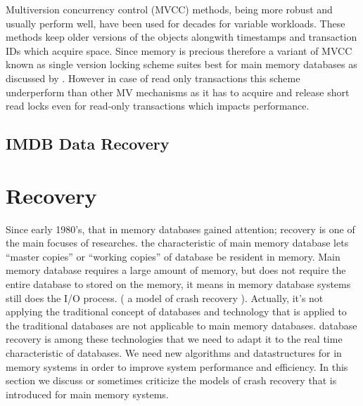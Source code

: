 \documentclass[12pt]{article} %
\begin{document}
Multiversion concurrency control (MVCC) methods, being more robust and usually perform well, have been used for decades for variable workloads. These methods keep older versions of the objects alongwith timestamps and transaction IDs which acquire space. Since memory is precious therefore a variant of MVCC known as single version locking scheme suites best for main memory databases as discussed by \cite{larson2011high}. However in case of read only transactions this scheme underperform than other MV mechanisms as it has to acquire and release short read locks even for read-only transactions which impacts performance.



\subsection{IMDB Data Recovery}



\section{Recovery}

Since early 1980’s, that in memory databases gained attention; recovery is one of the main focuses of researches.  the characteristic of main memory database lets “master copies” or “working copies” of database be resident in memory. Main memory database requires a large amount of memory, but does not require the entire database to stored on the memory, it means in memory database systems still does the I/O process. ( a model of crash recovery ). Actually, it’s not applying the traditional concept of databases and technology that is applied to the traditional databases are not applicable to main memory databases. database recovery is among these technologies that we need to adapt it to the real time characteristic of databases. We need new algorithms and datastructures for in memory systems in order to improve system performance and efficiency. In this section we discuss or sometimes criticize the models of crash recovery that is introduced for main memory systems.
\end{document}
